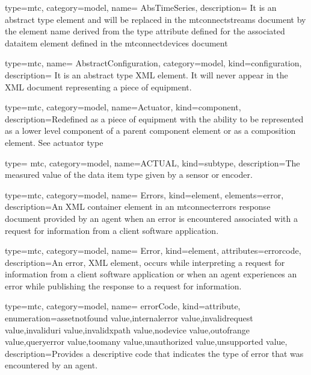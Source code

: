 

{
  type=mtc,
  category=model,
  name= {AbsTimeSeries},
  description= {It is an abstract type element and will be replaced in the \gls{mtconnectstreams} document by the element name derived from the \gls{type} attribute defined for the associated \gls{dataitem} element defined in the \gls{mtconnectdevices} document}
}


{
  type=mtc,
  name= {AbstractConfiguration},
  category=model,
  kind={configuration},
  description= {It is an abstract type XML element.  It will never appear in the XML document representing a piece of equipment. }
}

{
  type=mtc,
  category=model,
  name={Actuator},
  kind={component},
  description={Redefined as a piece of equipment with the ability to be represented as a \gls{lower level} component of a parent \gls{component} element or as a \gls{composition} element. See \gls{actuator type}}
}

{
  type= mtc,
  category=model,
  name={ACTUAL},
  kind={subtype},
  description={The measured value of the data item type given by a sensor or encoder.}
}


{
  type=mtc,
  category=model,
  name= {Errors},
  kind={element},
  elements={\gls{error}},
  description={An XML container element in an \gls{mtconnecterrors response document} provided by an \gls{agent} when an error is encountered associated with a \gls{request} for information from a client software application.}
}

{
  type=mtc,
  category=model,
  name= {Error},
  kind={element},
  attributes={\gls{errorcode}},
  description={An \gls{error}, XML element, occurs while interpreting a \gls{request} for information from a client software application or when an \gls{agent} experiences an error while publishing the \gls{response} to a \gls{request} for information.}
}

{
  type=mtc,
  category=model,
  name= {errorCode},
  kind={attribute},
  enumeration={\gls{assetnotfound value},\gls{internalerror value},\gls{invalidrequest value},\gls{invaliduri value},\gls{invalidxpath value},\gls{nodevice value},\gls{outofrange value},\gls{queryerror value},\gls{toomany value},\gls{unauthorized value},\gls{unsupported value}},
  description={Provides a descriptive code that indicates the type of error that was encountered by an \gls{agent}.}
}


